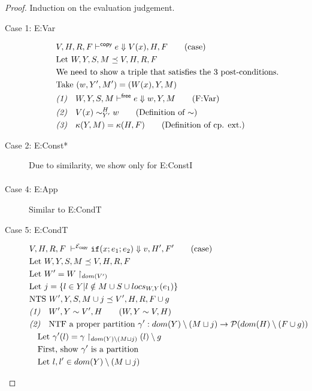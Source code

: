 \documentclass[11pt]{article}
\newcommand{\ms}[1]{\ensuremath{\mathsf{#1}}}
\newcommand{\veq}[4]{#3 \sim^{#1}_{#2} #4}
\newcommand{\copySem}{\ensuremath{\mathcal{E}_{\ms{copy}}}}
\theoremstyle{definition}
\begin{document}
\begin{proof}
Induction on the evaluation judgement.\\
\begin{description}
  \item[Case 1: E:Var]
  \begin{align*}
		&V,H,R,F \vdash^{\mathsf{copy}} e \Downarrow V(x),H,F \tag{case}\\
		&\text{Let } W,Y,S,M \preceq V,H,R,F\\
		&\text{We need to show a triple that satisfies the 3 post-conditions.}\\
		&\text{Take } (w,Y', M') = (W(x),Y,M)\\
		&\emph{(1)}\quad W,Y,S,M \vdash^{\mathsf{free}} e \Downarrow w,Y,M \tag{F:Var}\\
		&\emph{(2)}\quad  \veq{H}{Y'}{V(x)}{w} \tag{Definition of $\sim$}\\
		&\emph{(3)}\quad \kappa(Y,M) = \kappa(H,F) \tag{Definition of cp. ext.}\\
  \end{align*}
  \item[Case 2: E:Const*]
  Due to similarity, we show only for E:ConstI
  \begin{align*}
  \end{align*}
  \item[Case 4: E:App] Similar to E:CondT
  \item[Case 5: E:CondT]
  \begin{align*}
		&V,H,R,F \; \vdash^{\copySem} \ifexabt{x}{e_1}{e_2} \Downarrow v, H',F' \tag{case}\\
		&\text{Let } W,Y,S,M \preceq V,H,R,F \\
		&\text{Let } W' = W \restriction_{dom(V')}\\
		&\text{Let } j = \{l \in Y | l \notin M \cup S \cup locs_{W,Y}(e_1) \}\\
		&\text{NTS } W',Y,S,M \cup j \preceq V',H,R,F \cup g\\
		&\emph{(1)}\quad W',Y \sim V',H \tag{$W,Y \sim V,H$}\\
		&\emph{(2)}\quad \text{NTF a proper partition }
		 \gamma' : dom(Y) \setminus (M \sqcup j) \to \mathcal{P}(dom(H)\setminus (F \cup g))  \\
		&\quad \text{Let } \gamma'(l) = \gamma \restriction_{dom(Y)\setminus(M \sqcup j)}(l) \setminus g\\
		&\quad \text{First, show $\gamma'$ is a partition}\\
		&\quad \text{Let } l, l' \in dom(Y) \setminus (M \sqcup j)\\

\end{align*}
\end{description}
\end{proof}
\end{document}
